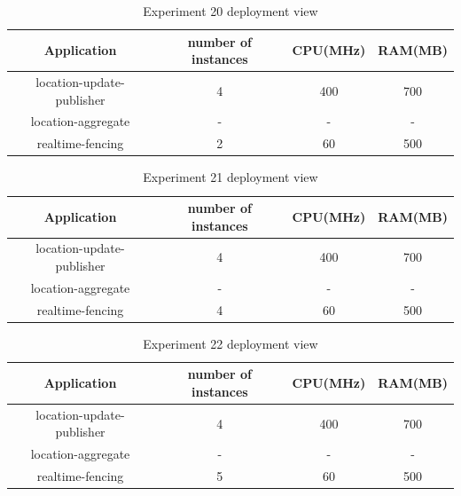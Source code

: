 \documentclass[a4]{report}
\begin{document}
    \begin{table}[h!]
        \centering
        \begin{tabular}{|c|c|c|c|}
            \hline
            Application               & number of instances & CPU(MHz) & RAM(MB) \\
            \hline
            location-update-publisher & 4                   & 400      & 700     \\
            location-aggregate        & -                   & -        & -       \\
            realtime-fencing          & 2                   & 60       & 500     \\
            \hline
        \end{tabular}
        \caption{Experiment 20 deployment view}
        \label{table:ex20-dv}
    \end{table}

    \begin{table}[h!]
        \centering
        \begin{tabular}{|c|c|c|c|}
            \hline
            Application               & number of instances & CPU(MHz) & RAM(MB) \\
            \hline
            location-update-publisher & 4                   & 400      & 700     \\
            location-aggregate        & -                   & -        & -       \\
            realtime-fencing          & 4                   & 60       & 500     \\
            \hline
        \end{tabular}
        \caption{Experiment 21 deployment view}
        \label{table:ex21-dv}
    \end{table}

    \begin{table}[h!]
        \centering
        \begin{tabular}{|c|c|c|c|}
            \hline
            Application               & number of instances & CPU(MHz) & RAM(MB) \\
            \hline
            location-update-publisher & 4                   & 400      & 700     \\
            location-aggregate        & -                   & -        & -       \\
            realtime-fencing          & 5                   & 60       & 500     \\
            \hline
        \end{tabular}
        \caption{Experiment 22 deployment view}
        \label{table:ex22-dv}
    \end{table}
\end{document}
